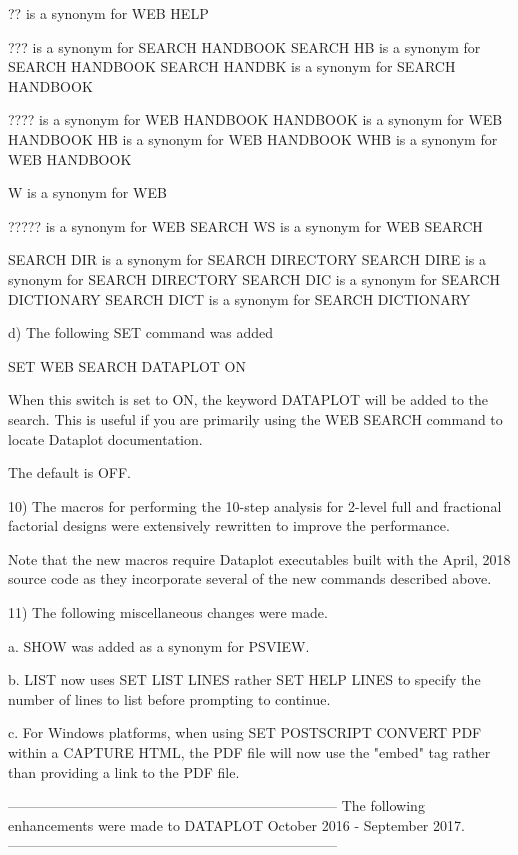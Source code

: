           ?? is a synonym for WEB HELP

          ??? is a synonym for SEARCH HANDBOOK
          SEARCH HB is a synonym for SEARCH HANDBOOK
          SEARCH HANDBK is a synonym for SEARCH HANDBOOK

          ???? is a synonym for WEB HANDBOOK
          HANDBOOK is a synonym for WEB HANDBOOK
          HB is a synonym for WEB HANDBOOK
          WHB is a synonym for WEB HANDBOOK

          W is a synonym for WEB

          ????? is a synonym for WEB SEARCH
          WS is a synonym for WEB SEARCH

          SEARCH DIR is a synonym for SEARCH DIRECTORY
          SEARCH DIRE is a synonym for SEARCH DIRECTORY
          SEARCH DIC is a synonym for SEARCH DICTIONARY
          SEARCH DICT is a synonym for SEARCH DICTIONARY

    d) The following SET command was added

          SET WEB SEARCH DATAPLOT ON

       When this switch is set to ON, the keyword DATAPLOT will be added
       to the search.  This is useful if you are primarily using the
       WEB SEARCH command to locate Dataplot documentation.

       The default is OFF.

10) The macros for performing the 10-step analysis for 2-level full and
    fractional factorial designs were extensively rewritten to improve
    the performance.

    Note that the new macros require Dataplot executables built with the
    April, 2018 source code as they incorporate several of the new
    commands described above.

11) The following miscellaneous changes were made.

    a. SHOW was added as a synonym for PSVIEW.

    b. LIST now uses SET LIST LINES rather SET HELP LINES to specify the
       number of lines to list before prompting to continue.

    c. For Windows platforms, when using SET POSTSCRIPT CONVERT PDF
       within a CAPTURE HTML, the PDF file will now use the "embed"
       tag rather than providing a link to the PDF file.

-----------------------------------------------------------------------
The following enhancements were made to DATAPLOT
October 2016 - September 2017.
-----------------------------------------------------------------------

